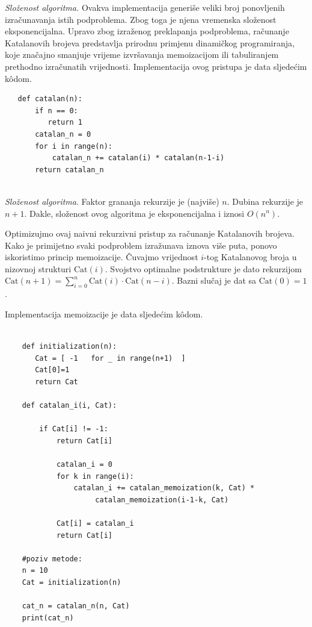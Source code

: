 \textit{Složenost algoritma.} Ovakva implementacija generiše veliki broj ponovljenih izračunavanja istih podproblema. Zbog toga je njena vremenska složenost eksponencijalna. Upravo zbog izraženog preklapanja podproblema, računanje Katalanovih brojeva predstavlja prirodnu primjenu dinamičkog programiranja, koje značajno smanjuje vrijeme izvršavanja memoizacijom ili tabuliranjem prethodno izračunatih vrijednosti.
 Implementacija ovog pristupa je data sljedećim k\^odom. 
 
 \begin{verbatim}
   def catalan(n):
       if n == 0:
          return 1
       catalan_n = 0 
       for i in range(n): 
           catalan_n += catalan(i) * catalan(n-1-i) 
       return catalan_n
        
 \end{verbatim}
  
  \emph{Složenost algoritma}. Faktor grananja rekurzije je (najviše) $n$. Dubi\-na rekurzije je $n+1$. Dakle, složenost ovog algoritma je eksponencijalna i iznosi $O(n^n)$. 

Optimizujmo ovaj naivni rekurzivni pristup za računanje Katalanovih brojeva. Kako je primijetno svaki podproblem izražunava iznova više puta, ponovo iskoristimo princip memoizacije. Čuvajmo vrijednost $i$-tog Katalano\-vog broja u nizovnoj strukturi $\textrm{Cat}(i)$.  Svojstvo optimalne podstrukture je dato rekurzijom $\textrm{Cat}(n+1) = \sum_{i=0}^{n} \textrm{Cat}(i) \cdot \textrm{Cat}(n-i).$ Bazni slučaj je dat sa $\textrm{Cat}(0) =1$.

Implementacija memoizacije je data sljedećim k\^odom.

  \begin{verbatim}
	
	def initialization(n):
	   Cat = [ -1   for _ in range(n+1)  ] 
	   Cat[0]=1
	   return Cat 
	
	def catalan_i(i, Cat): 
	
	    if Cat[i] != -1:
	        return Cat[i]
     
            catalan_i = 0
            for k in range(i): 
                catalan_i += catalan_memoization(k, Cat) *
                     catalan_memoization(i-1-k, Cat)
    
            Cat[i] = catalan_i
            return Cat[i]
    
	#poziv metode:
	n = 10
	Cat = initialization(n) 
	
	cat_n = catalan_n(n, Cat) 
	print(cat_n)
\end{verbatim}  

